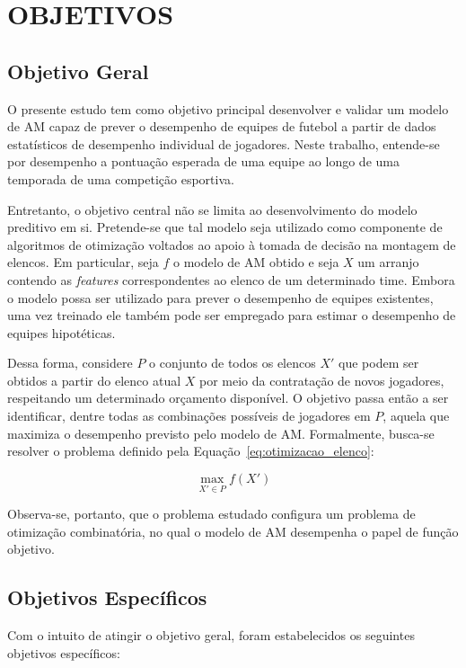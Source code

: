 \chapter{OBJETIVOS}

\section{Objetivo Geral}

O presente estudo tem como objetivo principal desenvolver e validar um 
modelo de AM capaz de prever o desempenho de 
equipes de futebol a partir de dados estatísticos de desempenho individual 
de jogadores. Neste trabalho, entende-se por desempenho a pontuação esperada 
de uma equipe ao longo de uma temporada de uma competição esportiva.

Entretanto, o objetivo central não se limita ao desenvolvimento 
do modelo preditivo em si. Pretende-se que tal modelo seja utilizado 
como componente de algoritmos de otimização voltados ao apoio à 
tomada de decisão na montagem de elencos. Em particular, seja $f$ o 
modelo de AM obtido e seja $X$ um arranjo contendo as \textit{features} 
correspondentes ao elenco de um determinado time. Embora o modelo possa 
ser utilizado para prever o desempenho de equipes existentes, uma vez 
treinado ele também pode ser empregado para estimar o desempenho de 
equipes hipotéticas.

Dessa forma, considere $P$ o conjunto de todos os elencos $X'$ que 
podem ser obtidos a partir do elenco atual $X$ por meio da contratação 
de novos jogadores, respeitando um determinado orçamento disponível. 
O objetivo passa então a ser identificar, dentre todas as combinações 
possíveis de jogadores em $P$, aquela que maximiza o desempenho 
previsto pelo modelo de AM. Formalmente, busca-se resolver o problema 
definido pela Equação~\ref{eq:otimizacao_elenco}:

\begin{equation}
\max_{X' \in P} f(X')
\label{eq:otimizacao_elenco}
\end{equation}

Observa-se, portanto, que o problema estudado configura um problema 
de otimização combinatória, no qual o modelo de AM desempenha o papel 
de função objetivo.

\section{Objetivos Específicos}

Com o intuito de atingir o objetivo geral, foram estabelecidos os 
seguintes objetivos específicos:

